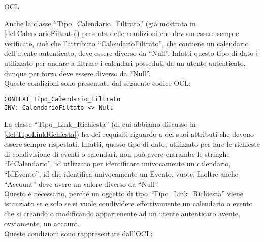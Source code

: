 \begin{listaPersonale}{OCL}
    \begin{center}
        
    \end{center}
    Anche la classe “Tipo\_Calendario\_Filtrato” (già mostrata in \ref{dcl:CalendarioFiltrato}) presenta delle condizioni che devono essere sempre verificate, cioè che l'attributo “CalendarioFiltrato”, che contiene un calendario dell'utente autenticato, deve essere diverso da “Null”. Infatti questo tipo di dato è utilizzato per andare a filtrare i calendari posseduti da un utente autenticato, dunque per forza deve essere diverso da “Null”. \\
    Queste condizioni sono presentate dal seguente codice OCL:
    \begin{lstlisting}
CONTEXT Tipo_Calendario_Filtrato
INV: CalendarioFiltato <> Null
    \end{lstlisting}




    \begin{center}
        
    \end{center}
    La classe “Tipo\_Link\_Richiesta” (di cui abbiamo discusso in \ref{dcl:TipoLinkRichiesta}) ha dei requisiti riguardo a dei suoi attributi che devono essere sempre rispettati. Infatti, questo tipo di dato, utilizzato per fare le richieste di condivisione di eventi o calendari, non può avere entrambe le stringhe “IdCalendario”, id utlizzato per identificare univocamente un calendario, “IdEvento”, id che identifica univocamente un Evento, vuote. Inoltre anche “Account” deve avere un valore diverso da “Null”. \\ Questo è necessario, perché un oggetto di tipo “Tipo\_Link\_Richiesta” viene istanziato se e solo se si vuole condividere effettivamente un calendario o evento che si creando o modificando appartenente ad un utente autenticato avente, ovviamente, un account.\\
    Queste condizioni sono rappresentate dall'OCL:


\end{listaPersonale}
